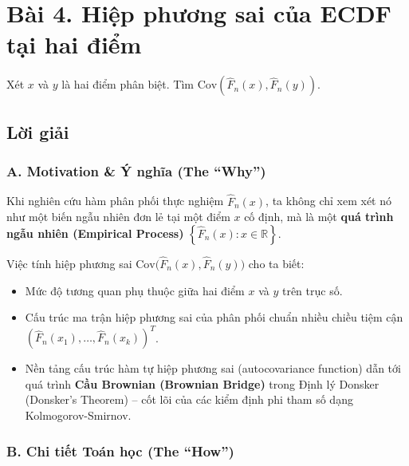 \documentclass[12pt,a4paper]{article}
\begin{document}
\section{Bài 4. Hiệp phương sai của ECDF tại hai điểm}\label{buxe0i-4.-hiux1ec7p-phux1b0ux1a1ng-sai-cux1ee7a-ecdf-tux1ea1i-hai-ux111iux1ec3m}

\begin{debai}

Xét \(x\) và \(y\) là hai điểm phân biệt. Tìm \(\text{Cov}\left(\widehat{F}_n(x), \widehat{F}_n(y)\right)\).

\end{debai}
\subsection*{Lời giải}

\subsubsection{A. Motivation \& Ý nghĩa (The ``Why'')}\label{a.-motivation-uxfd-nghux129a-the-why-3}

Khi nghiên cứu hàm phân phối thực nghiệm \(\widehat{F}_n(x)\), ta không chỉ xem xét nó như một biến ngẫu nhiên đơn lẻ tại một điểm \(x\) cố định, mà là một \textbf{quá trình ngẫu nhiên (Empirical Process)} \(\left\{ \widehat{F}_n(x) : x \in \mathbb{R} \right\}\).

Việc tính hiệp phương sai \(\text{Cov}\big(\widehat{F}_n(x), \widehat{F}_n(y)\big)\) cho ta biết:

\begin{itemize}

\item
  Mức độ tương quan phụ thuộc giữa hai điểm \(x\) và \(y\) trên trục số.
\item
  Cấu trúc ma trận hiệp phương sai của phân phối chuẩn nhiều chiều tiệm cận \(\left(\widehat{F}_n(x_1), \dots, \widehat{F}_n(x_k)\right)^T\).
\item
  Nền tảng cấu trúc hàm tự hiệp phương sai (autocovariance function) dẫn tới quá trình \textbf{Cầu Brownian (Brownian Bridge)} trong Định lý Donsker (Donsker's Theorem) -- cốt lõi của các kiểm định phi tham số dạng Kolmogorov-Smirnov.
\end{itemize}

\subsubsection{B. Chi tiết Toán học (The ``How'')}\label{b.-chi-tiux1ebft-touxe1n-hux1ecdc-the-how-3}
\end{document}
